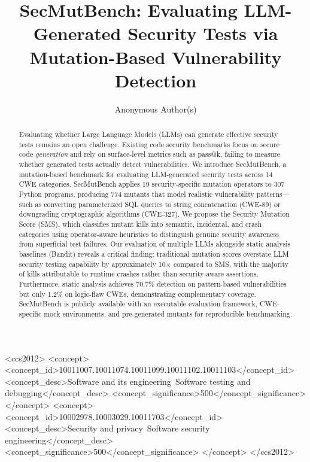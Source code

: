 \documentclass[sigconf,review,anonymous]{acmart}
\begin{document}
\title{SecMutBench: Evaluating LLM-Generated Security Tests via Mutation-Based Vulnerability Detection}

\author{Anonymous Author(s)}

\begin{abstract}
Evaluating whether Large Language Models (LLMs) can generate effective security tests remains an open challenge. Existing code security benchmarks focus on secure code \emph{generation} and rely on surface-level metrics such as pass@k, failing to measure whether generated tests actually detect vulnerabilities. We introduce SecMutBench, a mutation-based benchmark for evaluating LLM-generated security tests across 14 CWE categories. SecMutBench applies 19 security-specific mutation operators to 307 Python programs, producing 774 mutants that model realistic vulnerability patterns---such as converting parameterized SQL queries to string concatenation (CWE-89) or downgrading cryptographic algorithms (CWE-327). We propose the Security Mutation Score (SMS), which classifies mutant kills into semantic, incidental, and crash categories using operator-aware heuristics to distinguish genuine security awareness from superficial test failures. Our evaluation of multiple LLMs alongside static analysis baselines (Bandit) reveals a critical finding: traditional mutation scores overstate LLM security testing capability by approximately 10$\times$ compared to SMS, with the majority of kills attributable to runtime crashes rather than security-aware assertions. Furthermore, static analysis achieves 70.7\% detection on pattern-based vulnerabilities but only 1.2\% on logic-flaw CWEs, demonstrating complementary coverage. SecMutBench is publicly available with an executable evaluation framework, CWE-specific mock environments, and pre-generated mutants for reproducible benchmarking.
\end{abstract}

\begin{CCSXML}
<ccs2012>
<concept>
<concept_id>10011007.10011074.10011099.10011102.10011103</concept_id>
<concept_desc>Software and its engineering~Software testing and debugging</concept_desc>
<concept_significance>500</concept_significance>
</concept>
<concept>
<concept_id>10002978.10003029.10011703</concept_id>
<concept_desc>Security and privacy~Software security engineering</concept_desc>
<concept_significance>500</concept_significance>
</concept>
</ccs2012>
\end{CCSXML}

\end{document}
